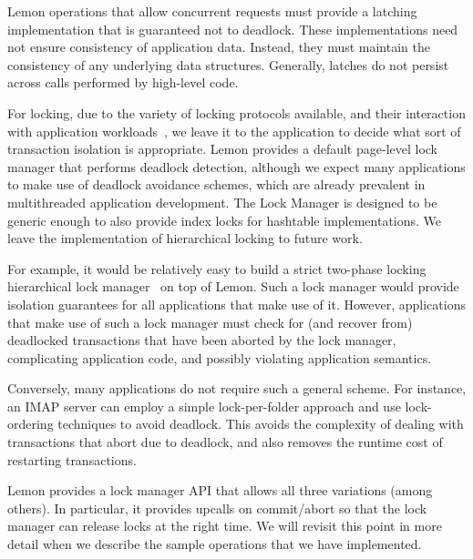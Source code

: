 \documentclass[letterpaper,twocolumn,english]{article}
\newcommand{\yad}{Lemon\xspace}
\begin{document}
\yad operations that allow concurrent requests must provide a
latching implementation that is guaranteed not to deadlock.  These
implementations need not ensure consistency of application data.
Instead, they must maintain the consistency of any underlying data
structures.  Generally, latches do not persist across calls performed 
by high-level code.

For locking, due to the variety of locking protocols available, and
their interaction with application
workloads~\cite{multipleGenericLocking}, we leave it to the
application to decide what sort of transaction isolation is
appropriate.  \yad provides a default page-level lock manager that
performs deadlock detection, although we expect many applications to
make use of deadlock avoidance schemes, which are already prevalent in
multithreaded application development.  The Lock Manager is designed 
to be generic enough to also provide index locks for hashtable 
implementations.  We leave the implementation of hierarchical locking 
to future work.

For example, it would be relatively easy to build a strict two-phase
locking hierarchical lock
manager~\cite{hierarcicalLocking,hierarchicalLockingOnAriesExample} on
top of \yad.  Such a lock manager would provide isolation guarantees
for all applications that make use of it.  However, applications that
make use of such a lock manager must check for (and recover from)
deadlocked transactions that have been aborted by the lock manager,
complicating application code, and possibly violating application semantics.

Conversely, many applications do not require such a general scheme.
For instance, an IMAP server can employ a simple lock-per-folder
approach and use lock-ordering techniques to avoid deadlock.  This
avoids the complexity of dealing with transactions that abort due
to deadlock, and also removes the runtime cost of restarting 
transactions.

\yad provides a lock manager API that allows all three variations
(among others). In particular, it provides upcalls on commit/abort so
that the lock manager can release locks at the right time. We will
revisit this point in more detail when we describe the sample
operations that we have implemented.

\end{document}
